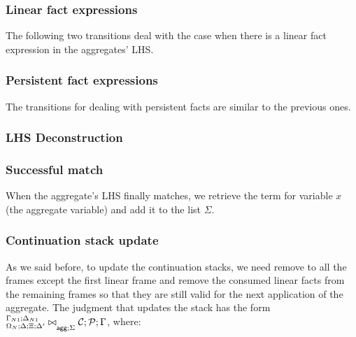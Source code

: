 \subsubsection{Linear fact expressions}

The following two transitions deal with the case when there is a linear
fact expression in the aggregates' LHS.



\subsubsection{Persistent fact expressions}

The transitions for dealing with persistent facts are similar to the previous
ones.



\subsubsection{LHS Deconstruction}




\subsubsection{Successful match}

When the aggregate's LHS finally matches, we retrieve the term for variable $x$
(the aggregate variable) and add it to the list $\Sigma$.



\subsubsection{Continuation stack update}

As we said before, to update the continuation stacks, we need remove to all the
frames except the first linear frame and remove the consumed linear facts from
the remaining frames so that they are still valid for the next application of
the aggregate.  The judgment that updates the stack has the form
${{}^{\Gamma_{N1} ; \Delta_{N1}}_{\Omega_N ; \Delta; \Xi; \Delta'}\bowtie}_{\mathsf{agg} ; \Sigma} \; \mathcal{C};
   \mathcal{P} ; \Gamma$, where:

